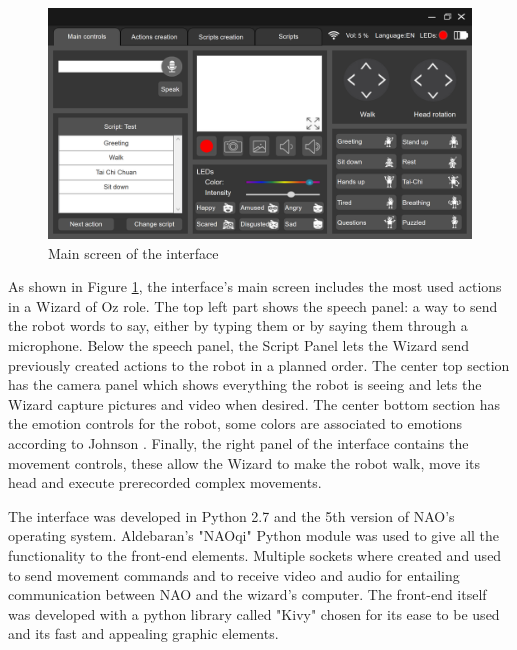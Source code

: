 \documentclass{article}
\begin{document}
    \begin{figure}[ht]
        \centering
        \includegraphics[width=\textwidth]{MainEN.png}
        \caption{Main screen of the interface\label{ref:pantalla1}}
    \end{figure}
    
    As shown in Figure \ref{ref:pantalla1}, the interface's main screen includes the most used actions in a Wizard of Oz role. The top left part shows the speech panel: a way to send the robot words to say, either by typing them or by saying them through a microphone. Below the speech panel, the Script Panel lets the Wizard send previously created actions to the robot in a planned order. The center top section has the camera panel which shows everything the robot is seeing and lets the Wizard capture pictures and video when desired. The center bottom section has the emotion controls for the robot, some colors are associated to emotions according to Johnson \cite{emotion}. 
    Finally, the right panel of the interface contains the movement controls, these allow the Wizard to make the robot walk, move its head and execute prerecorded complex movements.\par
    The interface was developed in Python 2.7 and the 5th version of NAO's operating system.
    Aldebaran's "NAOqi" Python module \cite{aldebaran} was used to give all the functionality to the front-end elements. Multiple sockets where created and used to send movement commands and to receive video and audio for entailing communication between NAO and the wizard's computer. The front-end itself was developed with a python library called "Kivy"\cite{kivy} chosen for its ease to be used and its fast and appealing graphic elements.\par
    
\end{document}
